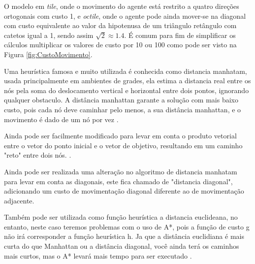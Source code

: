 O modelo em \textit{tile}, onde o movimento do agente está restrito a quatro direções ortogonais com custo 1, e \textit{octile}, onde o agente pode ainda mover-se na diagonal com custo equivalente ao valor da hipotenusa de um triângulo retângulo com catetos igual a 1, sendo assim  $ \sqrt{2}  \approx 1.4 $. É comum para fim de simplificar os cálculos multiplicar os valores de custo por 10 ou 100 como pode ser visto na Figura \ref{fig:CustoMovimento}.

\begin{minipage}{\linewidth}
    \label{fig:CustoMovimento}
\end{minipage}

Uma heurística famosa e muito utilizada é conhecida como distancia manhatam, usada principalmente em ambientes de grades, ela estima a distancia real entre os nós pela soma do deslocamento vertical e horizontal entre dois pontos, ignorando qualquer obstaculo.
A distância manhattan garante a solução com mais baixo custo, pois cada nó deve caminhar pelo menos, a sua distância manhattan, e o movimento é dado de um nó por vez \cite{Korf2000}.

Ainda pode ser facilmente modificado para levar em conta o produto vetorial entre o vetor do ponto inicial e o vetor de objetivo, resultando em um caminho "reto" entre dois nós. \cite{GameProgrammingHeuristics}.

Ainda pode ser realizada uma alteração no algoritmo de distancia manhatam para levar em conta as diagonais, este fica chamado de "distancia diagonal", adicionando um custo de movimentação diagonal diferente ao de movimentação adjacente.

Também pode ser utilizada como função heurística a distancia euclideana, no entanto, neste caso teremos problemas com o uso de A*, pois a função de custo g não irá corresponder a função heurística h. Ja que a  distância euclidiana é mais curta do que Manhattan ou a distância diagonal, você ainda terá os caminhos mais curtos, mas o A* levará mais tempo para ser executado \cite{GameProgrammingHeuristics}.

